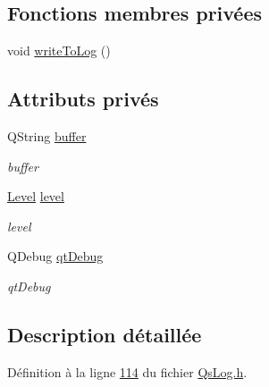 \subsection*{Fonctions membres privées}
\begin{DoxyCompactItemize}
\item 
void \hyperlink{classQsLogging_1_1Logger_1_1Helper_a30e01167d1f088bade18b71a3e85379b}{write\-To\-Log} ()
\end{DoxyCompactItemize}
\subsection*{Attributs privés}
\begin{DoxyCompactItemize}
\item 
Q\-String \hyperlink{classQsLogging_1_1Logger_1_1Helper_ac7ad574c2643ca74519e49ff1f51aad4}{buffer}
\begin{DoxyCompactList}\small\item\em buffer \end{DoxyCompactList}\item 
\hyperlink{namespaceQsLogging_a38c7dd87e4de6f8eb460763ad0baa033}{Level} \hyperlink{classQsLogging_1_1Logger_1_1Helper_a8de516c069064c29643f7bd1face4f32}{level}
\begin{DoxyCompactList}\small\item\em level \end{DoxyCompactList}\item 
Q\-Debug \hyperlink{classQsLogging_1_1Logger_1_1Helper_a5a1c439896fc0737f578a04cbbe6fa65}{qt\-Debug}
\begin{DoxyCompactList}\small\item\em qt\-Debug \end{DoxyCompactList}\end{DoxyCompactItemize}


\subsection{Description détaillée}


Définition à la ligne \hyperlink{QsLog_8h_source_l00114}{114} du fichier \hyperlink{QsLog_8h_source}{Qs\-Log.\-h}.



